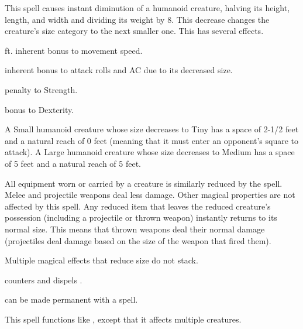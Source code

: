 \spellrng{\rngclose}
\begin{spelleffect}
  This spell causes instant diminution of a humanoid creature, halving its height, length, and width and dividing its weight by 8. This decrease changes the creature's size category to the next smaller one. This has several effects.
  \begin{itemize*} 
    \item {} ft. inherent bonus to movement speed.
    \item {} inherent bonus to attack rolls and AC due to its decreased size.
  \item {} penalty to Strength.
  \item {} bonus to Dexterity. \bonusscalingdescription
  \end{itemize*}
  \par A Small humanoid creature whose size decreases to Tiny has a space of 2-1/2 feet and a natural reach of 0 feet (meaning that it must enter an opponent's square to attack). A Large humanoid creature whose size decreases to Medium has a space of 5 feet and a natural reach of 5 feet.
  \par All equipment worn or carried by a creature is similarly reduced by the spell. Melee and projectile weapons deal less damage. Other magical properties are not affected by this spell. Any reduced item that leaves the reduced creature's possession (including a projectile or thrown weapon) instantly returns to its normal size. This means that thrown weapons deal their normal damage (projectiles deal damage based on the size of the weapon that fired them).
\end{spelleffect}
\begin{spellnotes}
  Multiple magical effects that reduce size do not stack.
  \par {} counters and dispels .
  \par {} can be made permanent with a  spell.
\end{spellnotes}

\spellrng{\rngmed}
\begin{spelleffect}
  This spell functions like , except that it affects multiple creatures.
\end{spelleffect}


